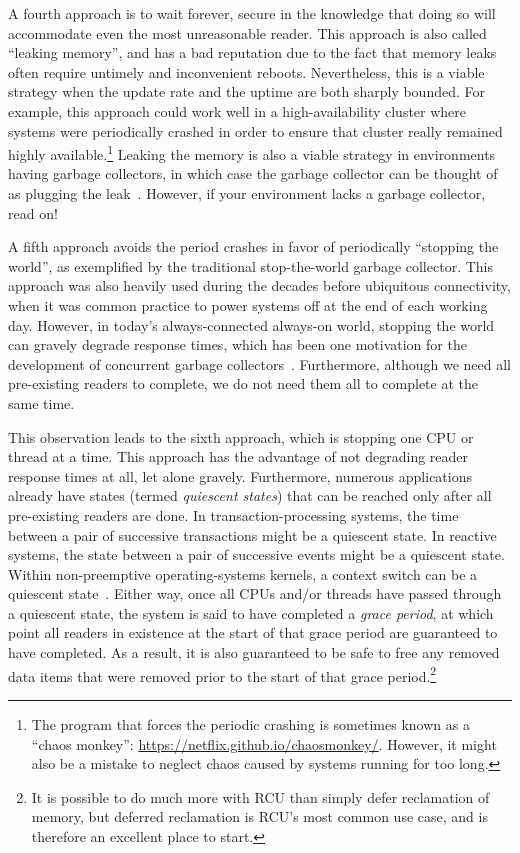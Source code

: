 A fourth approach is to wait forever, secure in the knowledge that
doing so will accommodate even the most unreasonable reader.
This approach is also called ``leaking memory'', and has a bad reputation
due to the fact that memory leaks often require untimely and
inconvenient reboots.
Nevertheless, this is a viable strategy when the update rate and the
uptime are both sharply bounded.
For example, this approach could work well in a high-availability
cluster where systems were periodically crashed in order to ensure
that cluster really remained highly available.\footnote{
	The program that forces the periodic crashing is sometimes
	known as a ``chaos monkey'':
	\url{https://netflix.github.io/chaosmonkey/}.
	However, it might also be a mistake to neglect chaos caused
	by systems running for too long.}
Leaking the memory is also a viable strategy in environments having
garbage collectors, in which case the garbage collector can be thought
of as plugging the leak~\cite{Kung80}.
However, if your environment lacks a garbage collector, read on!

A fifth approach avoids the period crashes in favor of periodically
``stopping the world'', as exemplified by the traditional stop-the-world
garbage collector.
This approach was also heavily used during the decades before
ubiquitous connectivity, when it was common practice to power systems
off at the end of each working day.
However, in today's always-connected always-on world, stopping the world
can gravely degrade response times, which has been one motivation for the
development of concurrent garbage collectors~\cite{DavidFBacon2003RTGC}.
Furthermore, although we need all pre-existing readers to complete, we do
not need them all to complete at the same time.

This observation leads to the sixth approach, which is stopping
one CPU or thread at a time.
This approach has the advantage of not degrading reader response times
at all, let alone gravely.
Furthermore, numerous applications already have states (termed
\emph{quiescent states}) that can be
reached only after all pre-existing readers are done.
In transaction-processing systems, the time between a pair of
successive transactions might be a quiescent state.
In reactive systems, the state between a pair of successive events
might be a quiescent state.
Within non-preemptive operating-systems kernels, a context switch can be
a quiescent state~\cite{McKenney98}.
Either way, once all CPUs and/or threads have passed through a quiescent
state, the system is said to have completed a \emph{grace period},
at which point all readers in existence at the start of that grace period
are guaranteed to have completed.
As a result, it is also guaranteed to be safe to free any removed data
items that were removed prior to the start of that grace period.\footnote{
	It is possible to do much more with RCU than simply defer
	reclamation of memory, but deferred reclamation is RCU's most
	common use case, and is therefore an excellent place to start.}

